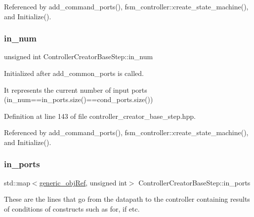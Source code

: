 Referenced by add\+\_\+command\+\_\+ports(), fsm\+\_\+controller\+::create\+\_\+state\+\_\+machine(), and Initialize().

\mbox{\label{classControllerCreatorBaseStep_a7913a7aff7c71c580fbc76ada00a5a5f}} 
\subsubsection{\texorpdfstring{in\+\_\+num}{in\_num}}
{\footnotesize\ttfamily unsigned int Controller\+Creator\+Base\+Step\+::in\+\_\+num\hspace{0.3cm}{\ttfamily [protected]}}



Initialized after add\+\_\+common\+\_\+ports is called. 

It represents the current number of input ports (in\+\_\+num==in\+\_\+ports.\+size()==cond\+\_\+ports.\+size()) 

Definition at line 143 of file controller\+\_\+creator\+\_\+base\+\_\+step.\+hpp.



Referenced by add\+\_\+command\+\_\+ports(), fsm\+\_\+controller\+::create\+\_\+state\+\_\+machine(), and Initialize().

\mbox{\label{classControllerCreatorBaseStep_a0d60e828352fd20c95a96dffe0ac9a28}} 
\subsubsection{\texorpdfstring{in\+\_\+ports}{in\_ports}}
{\footnotesize\ttfamily std\+::map$<$\hyperlink{generic__obj_8hpp_acb533b2ef8e0fe72e09a04d20904ca81}{generic\+\_\+obj\+Ref}, unsigned int$>$ Controller\+Creator\+Base\+Step\+::in\+\_\+ports\hspace{0.3cm}{\ttfamily [protected]}}



These are the lines that go from the datapath to the controller containing results of conditions of constructs such as for, if etc. 

